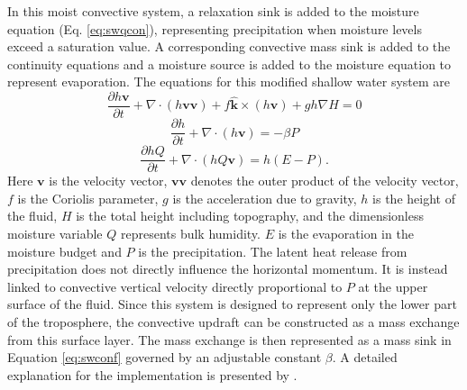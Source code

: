 \documentclass{ametsoc}
\begin{document}
     In this moist convective system, a relaxation sink is added to the moisture equation (Eq. \ref{eq:swqcon}), 
     representing precipitation when moisture levels exceed a saturation value. 
     A corresponding convective mass sink is added to the continuity equations and a 
     moisture source is added to the moisture equation to represent evaporation. 
     The equations for this modified shallow water system are
   \begin{equation}
     \label{eq:swmomf} \frac{\partial h \mathbf{v}}{\partial t} +
     \nabla \cdot ( h \mathbf{v} \mathbf{v}) + f \mathbf{\hat{k}}\times(h\mathbf{v}) + gh\nabla H = 0
   \end{equation}
   \begin{equation}
     \label{eq:swconf}  \frac{\partial h}{\partial t} + \nabla \cdot (h\mathbf{v}) = - \beta P 
   \end{equation}
   \begin{equation}
     \label{eq:swqcon}  \frac{\partial hQ}{\partial t} + \nabla \cdot (hQ\mathbf{v}) = h(E - P).
   \end{equation}
   Here $\mathbf{v}$ is the velocity vector, $\mathbf{v}\mathbf{v}$ denotes the outer product
   of the velocity vector, $f$ is the Coriolis parameter, $g$ is 
   the acceleration due to gravity,
   $h$ is the height of the fluid, $H$ is the total height including topography, and the
   dimensionless moisture variable $Q$ represents bulk humidity. 
   $E$ is the evaporation in the moisture budget and $P$ is the precipitation. 
   The latent heat release from precipitation does not directly influence the 
   horizontal momentum. It is instead linked to convective vertical velocity 
   directly proportional to $P$ at the upper surface of the fluid.
   Since this system is designed to represent only the lower part of the 
   troposphere, the convective updraft can be constructed as a mass exchange 
   from this surface layer. The mass exchange is then represented as a mass 
   sink in Equation \ref{eq:swconf} governed by an adjustable
   constant $\beta$.  A detailed explanation for the implementation is 
   presented by \cite{bouchut2009fronts}.
\end{document}
